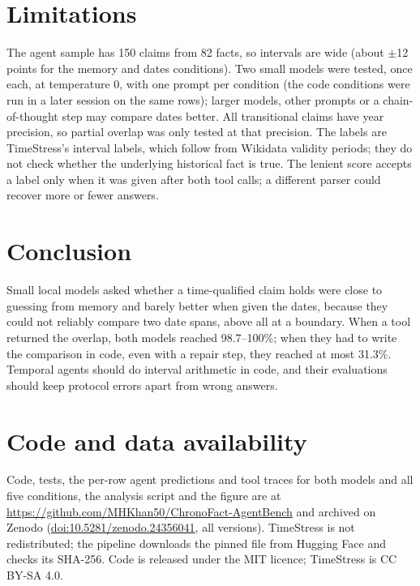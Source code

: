 \documentclass[11pt,a4paper]{article}
\begin{document}
\section{Limitations}

The agent sample has 150 claims from 82 facts, so intervals are wide (about $\pm$12 points for the memory and dates
conditions). Two small models were tested, once each, at temperature 0, with one prompt per condition (the code conditions were
run in a later session on the same rows); larger models,
other prompts or a chain-of-thought step may compare dates better. All transitional claims have year precision, so
partial overlap was only tested at that precision. The labels are TimeStress's interval labels, which follow from
Wikidata validity periods; they do not check whether the underlying historical fact is true. The lenient score
accepts a label only when it was given after both tool calls; a different parser could recover more or fewer answers.

\section{Conclusion}

Small local models asked whether a time-qualified claim holds were close to guessing from memory and barely better
when given the dates, because they could not reliably compare two date spans, above all at a boundary. When a tool
returned the overlap, both models reached 98.7--100\%; when they had to write the comparison in code, even with a
repair step, they reached at most 31.3\%. Temporal agents should do interval arithmetic in code, and
their evaluations should keep protocol errors apart from wrong answers.

\section*{Code and data availability}

Code, tests, the per-row agent predictions and tool traces for both models and all five conditions, the analysis script and the figure are
at \url{https://github.com/MHKhan50/ChronoFact-AgentBench} and archived on Zenodo
(\href{https://doi.org/10.5281/zenodo.24356041}{doi:10.5281/zenodo.24356041}, all versions). TimeStress is not redistributed; the pipeline downloads
the pinned file from Hugging Face and checks its SHA-256. Code is released under the MIT licence; TimeStress is
CC BY-SA 4.0.



\end{document}
